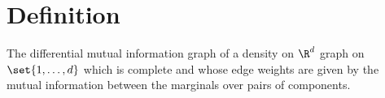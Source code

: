 

\section*{Definition}

The differential mutual information graph of a density on $\R ^d$ graph on $\set{1, \dots , d}$ which is complete and whose edge weights are given by the mutual information between the marginals over pairs of components.

\blankpage